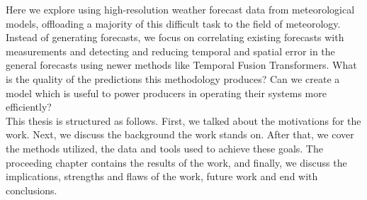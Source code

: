 Here we explore using high-resolution weather forecast data from meteorological models, offloading a majority of this difficult task to the field of meteorology. Instead of generating forecasts, we focus on correlating existing forecasts with measurements and detecting and reducing temporal and spatial error in the general forecasts using newer methods like Temporal Fusion Transformers.
What is the quality of the predictions this methodology produces? Can we create a model which is useful to power producers in operating their systems more efficiently?\\


This thesis is structured as follows. First, we talked about the motivations for the work. Next, we discuss the background the work stands on. After that, we cover the methods utilized, the data and tools used to achieve these goals. The proceeding chapter contains the results of the work, and finally, we discuss the implications, strengths and flaws of the work, future work and end with conclusions.








